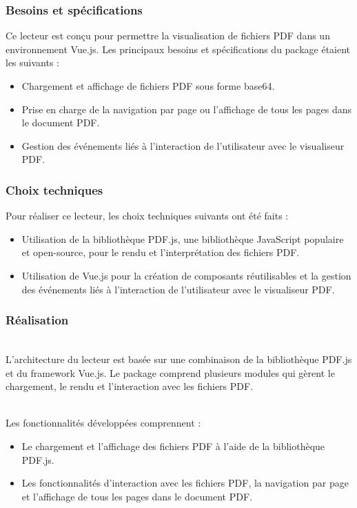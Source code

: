 \subsubsection{Besoins et spécifications}
Ce lecteur est conçu pour permettre la visualisation de fichiers PDF dans un environnement Vue.js. Les principaux besoins et spécifications du package étaient les suivants :
\begin{itemize}
  \item Chargement et affichage de fichiers PDF sous forme base64.
  \item Prise en charge de la navigation par page ou l'affichage de tous les pages dans le document PDF.
  \item Gestion des événements liés à l'interaction de l'utilisateur avec le visualiseur PDF.
\end{itemize}

\subsubsection{Choix techniques}
Pour réaliser ce lecteur, les choix techniques suivants ont été faits :
\begin{itemize}
  \item Utilisation de la bibliothèque PDF.js, une bibliothèque JavaScript populaire et open-source, pour le rendu et l'interprétation des fichiers PDF.
  \item Utilisation de Vue.js pour la création de composants réutilisables et la gestion des événements liés à l'interaction de l'utilisateur avec le visualiseur PDF.
\end{itemize}

\subsubsection{Réalisation}

\\
L'architecture du lecteur est basée sur une combinaison de la bibliothèque PDF.js et du framework Vue.js. Le package comprend plusieurs modules qui gèrent le chargement, le rendu et l'interaction avec les fichiers PDF.

\\
Les fonctionnalités développées comprennent :

\begin{itemize}
  \item Le chargement et l'affichage des fichiers PDF à l'aide de la bibliothèque PDF.js.
  \item Les fonctionnalités d'interaction avec les fichiers PDF, la navigation par page et l'affichage de tous les pages dans le document PDF.
\end{itemize}

